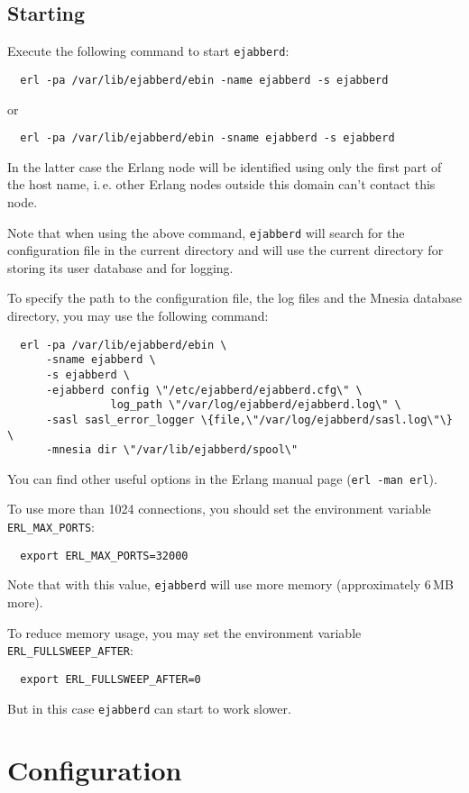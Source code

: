 \documentclass[a4paper,10pt]{article}
\newcommand{\ind}[1]{\begin{latexonly}\index{#1}\end{latexonly}}
\newcommand{\shell}[1]{\texttt{#1}}
\newcommand{\ejabberd}{\texttt{ejabberd}}
\begin{document}
\subsection{Starting}
\label{sec:starting}
\ind{starting}

Execute the following command to start \ejabberd{}:
\begin{verbatim}
  erl -pa /var/lib/ejabberd/ebin -name ejabberd -s ejabberd
\end{verbatim}
or
\begin{verbatim}
  erl -pa /var/lib/ejabberd/ebin -sname ejabberd -s ejabberd
\end{verbatim}
In the latter case the Erlang node will be identified using only the first part
of the host name, i.\,e. other Erlang nodes outside this domain can't contact
this node.

Note that when using the above command, \ejabberd{} will search for the
configuration file in the current directory and will use the current directory
for storing its user database and for logging.

To specify the path to the configuration file, the log files and the Mnesia
database directory, you may use the following command:
\begin{verbatim}
  erl -pa /var/lib/ejabberd/ebin \
      -sname ejabberd \
      -s ejabberd \
      -ejabberd config \"/etc/ejabberd/ejabberd.cfg\" \
                log_path \"/var/log/ejabberd/ejabberd.log\" \
      -sasl sasl_error_logger \{file,\"/var/log/ejabberd/sasl.log\"\} \
      -mnesia dir \"/var/lib/ejabberd/spool\"
\end{verbatim}

You can find other useful options in the Erlang manual page
(\shell{erl -man erl}).

To use more than 1024 connections, you should set the environment variable
\verb|ERL_MAX_PORTS|:
\begin{verbatim}
  export ERL_MAX_PORTS=32000
\end{verbatim}
Note that with this value, \ejabberd{} will use more memory (approximately 6\,MB
more).

To reduce memory usage, you may set the environment variable
\verb|ERL_FULLSWEEP_AFTER|:
\begin{verbatim}
  export ERL_FULLSWEEP_AFTER=0
\end{verbatim}
But in this case \ejabberd{} can start to work slower.


\section{Configuration}
\label{sec:configuration}
\end{document}
